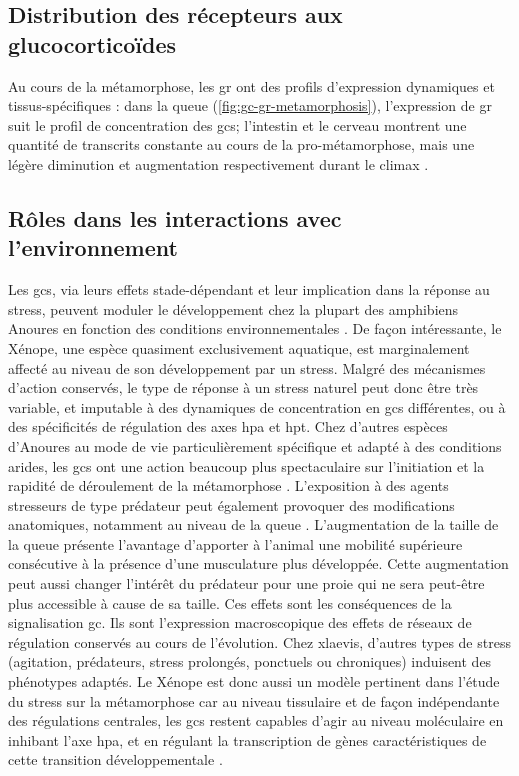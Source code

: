 \documentclass[../main.tex]{subfiles}
\begin{document}
	\subsection{Distribution des récepteurs aux glucocorticoïdes}
		Au cours de la métamorphose, les \gls{gr} ont des profils d'expression dynamiques et tissus-spécifiques :
		dans la queue (\autoref{fig:gc-gr-metamorphosis}), l'expression de \gls{gr} suit le profil de concentration des \glspl{gc}; l'intestin et le cerveau montrent une quantité de transcrits constante au cours de la pro-métamorphose, mais une légère diminution et augmentation respectivement durant le climax \citep{Krain2004}.

	\subsection{Rôles dans les interactions avec l'environnement}
		Les \glspl{gc}, via leurs effets stade-dépendant et leur implication dans la réponse au stress, peuvent moduler le développement chez la plupart des amphibiens Anoures en fonction des conditions environnementales \citep{Denver2009}.
		De façon intéressante, le Xénope, une espèce quasiment exclusivement aquatique, est marginalement affecté au niveau de son développement par un stress.
		Malgré des mécanismes d'action conservés, le type de réponse à un stress naturel peut donc être très variable, et imputable à des dynamiques de concentration en \glspl{gc} différentes, ou à des spécificités de régulation des axes \gls{hpa} et \gls{hpt}.
		Chez d'autres espèces d'Anoures au mode de vie particulièrement spécifique  et adapté à des conditions arides, les \glspl{gc} ont une action beaucoup plus spectaculaire sur l'initiation et la rapidité de déroulement de la métamorphose \citep{Kulkarni2011,Gomez-Mestre2013a}.
		L'exposition à des agents stresseurs de type prédateur peut également provoquer des modifications anatomiques, notamment au niveau de la queue \citep{Maher2013}.
		L'augmentation de la taille de la queue présente l'avantage d'apporter à l'animal une mobilité supérieure consécutive à la présence d'une musculature plus développée. Cette augmentation peut aussi changer l'intérêt du prédateur pour une proie qui ne sera peut-être plus accessible à cause de sa taille.
		Ces effets sont les conséquences de la signalisation \gls{gc}.
		Ils sont l'expression macroscopique des effets de réseaux de régulation conservés au cours de l'évolution.
		Chez \gls{xlaevis}, d'autres types de stress (agitation, prédateurs, stress prolongés, ponctuels ou chroniques) induisent des phénotypes adaptés.
		Le Xénope est donc aussi un modèle pertinent dans l'étude du stress sur la métamorphose car au niveau tissulaire et de façon indépendante des régulations centrales, les \glspl{gc} restent capables d'agir au niveau moléculaire en inhibant l'axe \gls{hpa}, et en régulant la transcription de gènes caractéristiques de cette transition développementale \citep{Hu2008,Bonett2010}.
\end{document}
